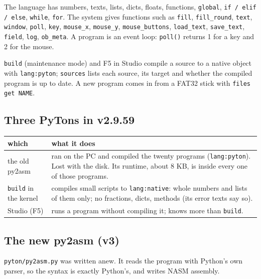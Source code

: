 \documentclass[11pt,a4paper]{article}
\newcommand{\file}[1]{\texttt{#1}}
\newcommand{\cmd}[1]{\texttt{#1}}
\begin{document}
\noindent The language has numbers, texts, lists, dicts, floats, functions, \texttt{global},
\texttt{if / elif / else}, \texttt{while}, \texttt{for}. The system gives functions such as
\texttt{fill}, \texttt{fill\_round}, \texttt{text}, \texttt{window}, \texttt{poll}, \texttt{key},
\texttt{mouse\_x}, \texttt{mouse\_y}, \texttt{mouse\_buttons}, \texttt{load\_text},
\texttt{save\_text}, \texttt{field}, \texttt{log}, \texttt{ob\_meta}. A program is an event loop:
\texttt{poll()} returns 1 for a key and 2 for the mouse.

\cmd{build} (maintenance mode) and F5 in Studio compile a source to a native object with
\texttt{lang:pyton}; \cmd{sources} lists each source, its target and whether the compiled program
is up to date. A new program comes in from a FAT32 stick with \cmd{files get NAME}.

\subsection{Three PyTons in v2.9.59}

\begin{longtable}{@{}p{3.6cm} p{11.4cm}@{}}
\toprule
which & what it does \\ \midrule
the old py2asm & ran on the PC and compiled the twenty programs (\texttt{lang:pyton}). Lost with
                 the disk. Its runtime, about 8 KB, is inside every one of those programs. \\
\cmd{build} in the kernel & compiles small scripts to \texttt{lang:native}: whole numbers and
                 lists of them only; no fractions, dicts, methods (its error texts say so). \\
Studio (F5) & runs a program without compiling it; knows more than \cmd{build}. \\
\bottomrule
\end{longtable}

\subsection{The new py2asm (v3)}

\file{pyton/py2asm.py} was written anew. It reads the program with Python's own parser, so the
syntax is exactly Python's, and writes NASM assembly.
\end{document}
